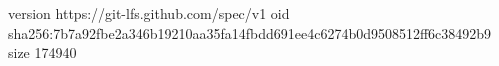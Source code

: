 version https://git-lfs.github.com/spec/v1
oid sha256:7b7a92fbe2a346b19210aa35fa14fbdd691ee4c6274b0d9508512ff6c38492b9
size 174940
